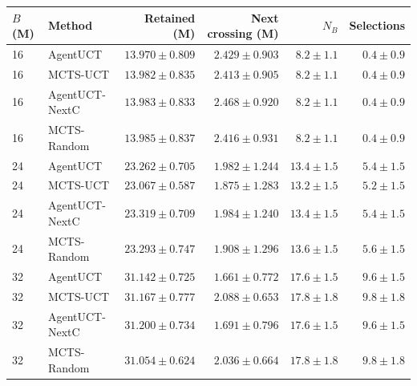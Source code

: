 \begin{tabular}{@{}llrrrr@{}}
\toprule
$B$ (M) & Method & Retained (M) & Next crossing (M) & $N_B$ & Selections \\
\midrule
16 & AgentUCT & $13.970 \pm 0.809$ & $2.429 \pm 0.903$ & $8.2 \pm 1.1$ & $0.4 \pm 0.9$ \\
16 & MCTS-UCT & $13.982 \pm 0.835$ & $2.413 \pm 0.905$ & $8.2 \pm 1.1$ & $0.4 \pm 0.9$ \\
16 & AgentUCT-NextC & $13.983 \pm 0.833$ & $2.468 \pm 0.920$ & $8.2 \pm 1.1$ & $0.4 \pm 0.9$ \\
16 & MCTS-Random & $13.985 \pm 0.837$ & $2.416 \pm 0.931$ & $8.2 \pm 1.1$ & $0.4 \pm 0.9$ \\
24 & AgentUCT & $23.262 \pm 0.705$ & $1.982 \pm 1.244$ & $13.4 \pm 1.5$ & $5.4 \pm 1.5$ \\
24 & MCTS-UCT & $23.067 \pm 0.587$ & $1.875 \pm 1.283$ & $13.2 \pm 1.5$ & $5.2 \pm 1.5$ \\
24 & AgentUCT-NextC & $23.319 \pm 0.709$ & $1.984 \pm 1.240$ & $13.4 \pm 1.5$ & $5.4 \pm 1.5$ \\
24 & MCTS-Random & $23.293 \pm 0.747$ & $1.908 \pm 1.296$ & $13.6 \pm 1.5$ & $5.6 \pm 1.5$ \\
32 & AgentUCT & $31.142 \pm 0.725$ & $1.661 \pm 0.772$ & $17.6 \pm 1.5$ & $9.6 \pm 1.5$ \\
32 & MCTS-UCT & $31.167 \pm 0.777$ & $2.088 \pm 0.653$ & $17.8 \pm 1.8$ & $9.8 \pm 1.8$ \\
32 & AgentUCT-NextC & $31.200 \pm 0.734$ & $1.691 \pm 0.796$ & $17.6 \pm 1.5$ & $9.6 \pm 1.5$ \\
32 & MCTS-Random & $31.054 \pm 0.624$ & $2.036 \pm 0.664$ & $17.8 \pm 1.8$ & $9.8 \pm 1.8$ \\
\bottomrule
\end{tabular}

